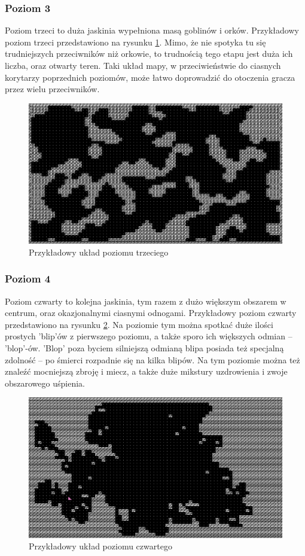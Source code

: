 \documentclass[12pt,twoside]{article}
\begin{document}
\subsubsection{Poziom 3}
Poziom trzeci to duża jaskinia wypełniona masą goblinów i orków. Przykładowy poziom trzeci przedstawiono na rysunku \ref{mygame:map3}. Mimo, że nie spotyka tu się trudniejszych przeciwników niż orkowie, to trudnością tego etapu jest duża ich liczba, oraz otwarty teren. Taki układ mapy, w przeciwieństwie do ciasnych korytarzy poprzednich poziomów, może łatwo doprowadzić do otoczenia gracza przez wielu przeciwników.

\FloatBarrier
\begin{figure}[h]
	\centering
	\includegraphics[width=12cm]{images/mygame/map3.png}
	\caption{Przykładowy układ poziomu trzeciego}
	\label{mygame:map3}
\end{figure}
\FloatBarrier


\subsubsection{Poziom 4}
Poziom czwarty to kolejna jaskinia, tym razem z dużo większym obszarem w centrum, oraz okazjonalnymi ciasnymi odnogami. Przykładowy poziom czwarty przedstawiono na rysunku \ref{mygame:map4}. Na poziomie tym można spotkać duże ilości prostych 'blip'ów z pierwszego poziomu, a także sporo ich większych odmian -- 'blop'-ów. 'Blop' poza byciem silniejszą odmianą blipa posiada też specjalną zdolność -- po śmierci rozpadnie się na kilka blipów. Na tym poziomie można też znaleźć mocniejszą zbroję i miecz, a także duże mikstury uzdrowienia i zwoje obszarowego uśpienia.

\FloatBarrier
\begin{figure}[h]
	\centering
	\includegraphics[width=12cm]{images/mygame/map4.png}
	\caption{Przykładowy układ poziomu czwartego}
	\label{mygame:map4}
\end{figure}
\FloatBarrier
\end{document}
